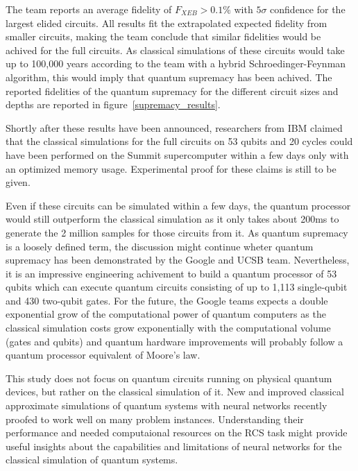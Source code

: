 The team reports an average fidelity of $F_{XEB} > 0.1\%$ with $5\sigma$ confidence
for the largest elided circuits. All results fit the extrapolated expected
fidelity from smaller circuits, making the team conclude that similar fidelities
would be achived for the full circuits. As classical simulations of these
circuits would take up to 100,000 years according to the team with a hybrid
Schroedinger-Feynman algorithm, this would imply
that quantum supremacy has been achived. The reported fidelities of the quantum supremacy for
the different circuit sizes and depths are reported in figure~\ref{supremacy_results}.

Shortly after these results have been announced, researchers from IBM claimed that the classical simulations
for the full circuits on 53 qubits and 20 cycles could have been performed
on the Summit supercomputer within a few days only with an optimized memory
usage. Experimental proof for these claims is still to be given.

Even if these circuits can be simulated within a few days, the quantum
processor would still outperform the classical simulation as it only
takes about 200ms to generate the 2 million samples for those circuits from it. As quantum
supremacy is a loosely defined term, the discussion might continue wheter
quantum supremacy has been demonstrated by the Google and UCSB team. Nevertheless, it is
an impressive engineering achivement to build a quantum processor of 53 qubits
which can execute quantum circuits consisting of up to 1,113 single-qubit and
430 two-qubit gates. For the future, the Google teams expects a double exponential grow of the computational
power of quantum computers as the classical simulation costs grow exponentially
with the computational volume (gates and qubits) and quantum hardware
improvements will probably follow a quantum processor equivalent of Moore's law.

This study does not focus on quantum circuits running on physical quantum devices,
but rather on the classical simulation of it. New and improved classical
approximate simulations of quantum systems with neural networks recently proofed
to work well on many problem instances. 
Understanding their performance and needed computaional resources on
the RCS task might provide useful insights about the capabilities and
limitations of neural networks for the classical simulation of quantum systems.


